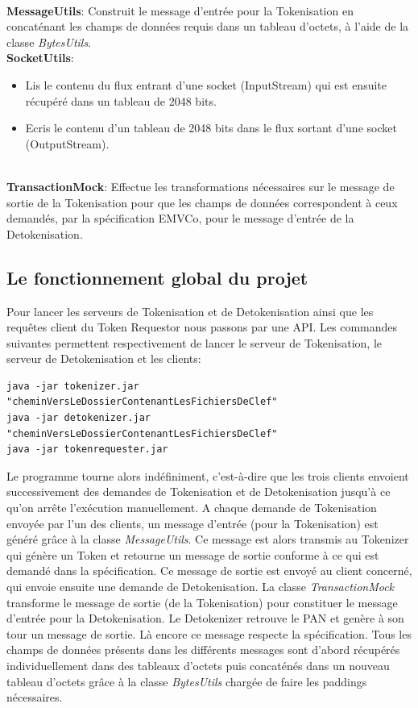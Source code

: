 \documentclass{report}
\begin{document}
~\\
\noindent
\textbf{MessageUtils}: Construit le message d'entrée pour la Tokenisation en concaténant les champs de données requis dans un tableau d'octets, à l'aide de la classe \textit{BytesUtils}.\\

\noindent
\textbf{SocketUtils}: 
\begin{itemize}
	\item Lis le contenu du flux entrant d'une socket (InputStream) qui est ensuite récupéré dans un tableau de 2048 bits.
	\item Ecris le contenu d'un tableau de 2048 bits dans le flux sortant d'une socket (OutputStream).
\end{itemize}

~\\
\noindent
\textbf{TransactionMock}: Effectue les transformations nécessaires sur le message de sortie de la Tokenisation pour que les champs de données correspondent à ceux demandés, par la spécification EMVCo, pour le message d'entrée de la Detokenisation.

\subsection{Le fonctionnement global du projet}
Pour lancer les serveurs de Tokenisation et de Detokenisation ainsi que les requêtes client du Token Requestor nous passons par une API. Les commandes suivantes permettent respectivement de lancer le serveur de Tokenisation, le serveur de Detokenisation et les clients:


\begin{lstlisting}
java -jar tokenizer.jar "cheminVersLeDossierContenantLesFichiersDeClef"
java -jar detokenizer.jar "cheminVersLeDossierContenantLesFichiersDeClef"
java -jar tokenrequester.jar
\end{lstlisting}


\noindent
Le programme tourne alors indéfiniment, c'est-à-dire que les trois clients envoient successivement des demandes de Tokenisation et de Detokenisation jusqu'à ce qu'on arrête l'exécution manuellement. A chaque demande de Tokenisation envoyée par l'un des clients, un message d'entrée (pour la Tokenisation) est généré grâce à la classe \textit{MessageUtils}. Ce message est alors transmis au Tokenizer qui génère un Token et retourne un message de sortie conforme à ce qui est demandé dans la spécification. Ce message de sortie est envoyé au client concerné, qui envoie ensuite une demande de Detokenisation. La classe \textit{TransactionMock} transforme le message de sortie (de la Tokenisation) pour constituer le message d'entrée pour la Detokenisation. Le Detokenizer retrouve le PAN et genère à son tour un message de sortie. Là encore ce message respecte la spécification. Tous les champs de données présents dans les différents messages sont d'abord récupérés individuellement dans des tableaux d'octets puis concaténés dans un nouveau tableau d'octets grâce à la classe \textit{BytesUtils} chargée de faire les paddings nécessaires.\\
\end{document}
